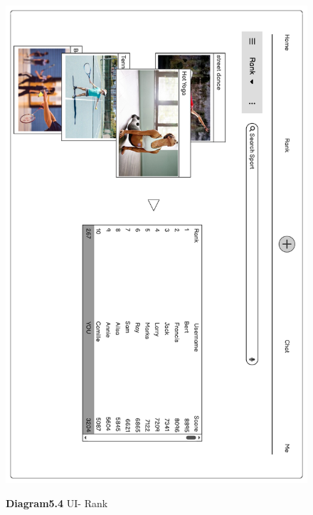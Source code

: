 \documentclass[a4paper]{article}
\begin{document}
	\begin{figure}[H]
		\centering
		\caption*{\textbf{Diagram5.4} UI- Rank}
		\includegraphics[width=1\textwidth]{images/UI_Final/UI_Final_4.pdf}
		\label{UI_4}
	\end{figure}
\end{document}
